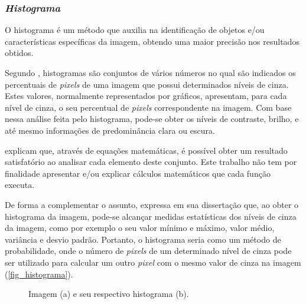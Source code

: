 \subsubsection{\textit{Histograma}}

O histograma é um método que auxilia na identificação de objetos e/ou características específicas da imagem, obtendo uma maior precisão nos resultados obtidos.

Segundo , histogramas são conjuntos de vários números no qual são indicados os percentuais de \textit{pixels} de uma imagem que possui determinados níveis de cinza. Estes valores, normalmente representados por gráficos, apresentam, para cada nível de cinza, o seu percentual de \textit{pixels} correspondente na imagem. Com base nessa análise feita pelo histograma, pode-se obter os níveis de contraste, brilho, e até mesmo informações de predominância clara ou escura.

 explicam que, através de equações matemáticas, é possível obter um resultado satisfatório ao analisar cada elemento deste conjunto. Este trabalho não tem por finalidade apresentar e/ou explicar cálculos matemáticos que cada função executa.

De forma a complementar o assunto,  expressa em sua dissertação que, ao obter o histograma da imagem, pode-se alcançar medidas estatísticas dos níveis de cinza da imagem, como por exemplo o seu valor mínimo e máximo, valor médio, variância e desvio padrão. Portanto, o histograma seria como um método de probabilidade, onde o número de \textit{pixels} de um determinado nível de cinza pode ser utilizado para calcular um outro \textit{pixel} com o mesmo valor de cinza na imagem (\autoref{fig_histograma}).

\begin{figure}[h]
	\caption{\label{fig_histograma}Imagem (a) e seu respectivo histograma (b).}
	\begin{center}
	\end{center}
	\centering {}
\end{figure}